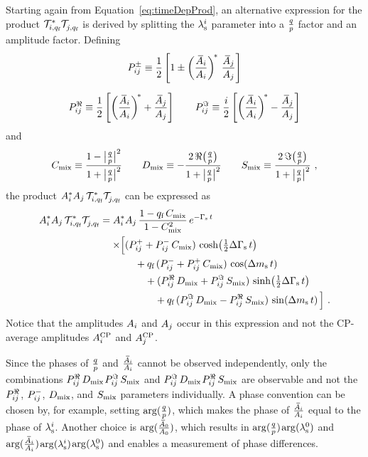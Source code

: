 Starting again from Equation~\ref{eq:timeDepProd}, an alternative expression for the product
$\timeAmp[i,\qf]^*\timeAmp[j,\qf]^{\phantom{*}}$ is derived by splitting the $\lamsi$ parameter into a $\qpAlt$ factor and an amplitude
factor. Defining
\begin{equation}
  \label{eq:decayRho}
  \begin{gathered}
    \Ppm \equiv \frac{1}{2} \left[ 1 \pm \left(\frac{\Abari}{\Ai}\right)^{\!*}\, \frac{\Abari[j]}{\Ai[j]} \right] \\[0.6em]
    \Pre \equiv \frac{1}{2} \left[ \left(\frac{\Abari}{\Ai}\right)^{\!*} + \frac{\Abari[j]}{\Ai[j]} \right] \quad\quad
    \Pim \equiv \frac{i}{2} \left[ \left(\frac{\Abari}{\Ai}\right)^{\!*} - \frac{\Abari[j]}{\Ai[j]} \right]
  \end{gathered}
\end{equation}
and
\begin{equation}
  \label{eq:mixCDS}
  \Cm \equiv \frac{1-\qpAbsAlt^2}{1+\qpAbsAlt^2}
  \qquad \Dm \equiv -\frac{2\,\Re\big(\qpAlt\big)}{1+\qpAbsAlt^2}
  \qquad \Sm \equiv  \frac{2\,\Im\big(\qpAlt\big)}{1+\qpAbsAlt^2}
  \ ,
\end{equation}
the product $\Ai^*\Ai[j]\,\timeAmp[i,\qf]^*\timeAmp[j,\qf]^{\phantom{*}}$ can be expressed as
\begin{equation}
  \label{eq:timeqfDepSep}
  \begin{aligned}
    \Ai^*\Ai[j]\,\timeAmp[i,\qf]^*\timeAmp[j,\qf]^{\phantom{*}} =
      \Ai^*&\Ai[j]\, \frac{1-\qf\,\Cm}{1-\Cm^2}\, \eGst \\
        \times\Big[ &(\Ppl+\Pmn\,\Cm)\,\cDGs \\
                    &\quad + \qf\,(\Pmn+\Ppl\,\Cm)\,\cDms \\
                    &\quad\quad + (\Pre\,\Dm+\Pim\,\Sm)\,\sDGs \\
                    &\quad\quad\quad + \qf\,(\Pim\,\Dm-\Pre\,\Sm)\,\sDms \Big] \ .
  \end{aligned}
\end{equation}
Notice that the amplitudes $\Ai$ and $\Ai[j]$ occur in this expression and not the CP-average amplitudes $\AAv$ and $\AAv[{\Ai[j]}]$.

Since the phases of $\qp$ and $\frac{\Abari}{\Ai}$ cannot be observed independently, only the combinations $\Pre\,\Dm$\textplus$\Pim\,\Sm$
and $\Pim\,\Dm$\textminus$\Pre\,\Sm$ are observable and not the $\Pre$, $\Pmn$, $\Dm$, and $\Sm$ parameters individually. A phase
convention can be chosen by, for example, setting $\arg(\qpAlt)$, which makes the phase of $\frac{\Abari}{\Ai}$ equal to the
phase of $\lamsi$. Another choice is $\arg(\frac{\Abari[\text{0}]}{\Ai[\text{0}]})$, which results in
$\arg(\qpAlt)$\texteq$\arg(\lamsi[\text{0}])$ and $\arg(\frac{\Abari}{\Ai})$\texteq$\arg(\lamsi)$\textminus$\arg(\lamsi[\text{0}])$ and
enables a measurement of phase differences.
